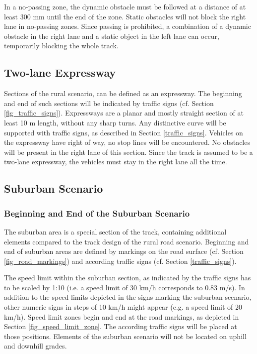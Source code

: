 \documentclass[a4paper]{report}
\begin{document}
In a no-passing zone, the dynamic obstacle must be followed at a distance of at
least 300 mm until the end of the zone. Static obstacles will not block the
right lane in no-passing zones. Since passing is prohibited, a combination of a
dynamic obstacle in the right lane and a static object in the left lane can
occur, temporarily blocking the whole track.

\subsection{Two-lane Expressway}

Sections of the rural scenario, can be defined as an expressway. The beginning
and end of such sections will be indicated by traffic signs (cf. Section
\ref{fig_traffic_signs}). Expressways are a planar and mostly straight section
of at least 10 m length, without any sharp turns. Any distinctive curve will be
supported with traffic signs, as described in Section \ref{traffic_signs}.
Vehicles on the expressway have right of way, no stop lines will be
encountered. No obstacles will be present in the right lane of this section.
Since the track is assumed to be a two-lane expressway, the vehicles must stay
in the right lane all the time.

\subsection{Suburban Scenario}

\subsubsection{Beginning and End of the Suburban Scenario}

The suburban area is a special section of the track, containing additional
elements compared to the track design of the rural road scenario. Beginning and
end of suburban areas are defined by markings on the road surface (cf. Section
\ref{fig_road_markings}) and according traffic signs (cf. Section
\ref{traffic_signs}).

The speed limit within the suburban section, as indicated by the traffic signs
has to be scaled by 1:10 (i.e. a speed limit of 30 km/h corresponds to 0.83
m/s). In addition to the speed limits depicted in the signs marking the
suburban scenario, other numeric signs in steps of 10 km/h might appear (e.g. a
speed limit of 20 km/h). Speed limit zones begin and end at the road markings,
as depicted in Section \ref{fig_speed_limit_zone}. The according traffic signs
will be placed at those positions. Elements of the suburban scenario will not
be located on uphill and downhill grades.
\end{document}
